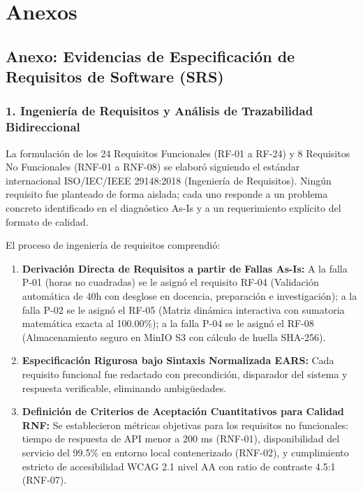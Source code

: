 \documentclass[12pt,a4paper]{article}
\begin{document}
\vspace{0.4cm}

\section{Anexos}

\subsection*{Anexo: Evidencias de Especificación de Requisitos de Software (SRS)}

\subsubsection*{1. Ingeniería de Requisitos y Análisis de Trazabilidad Bidireccional}
La formulación de los 24 Requisitos Funcionales (RF-01 a RF-24) y 8 Requisitos No Funcionales (RNF-01 a RNF-08) se elaboró siguiendo el estándar internacional ISO/IEC/IEEE 29148:2018 (Ingeniería de Requisitos). Ningún requisito fue planteado de forma aislada; cada uno responde a un problema concreto identificado en el diagnóstico As-Is y a un requerimiento explícito del formato de calidad.

El proceso de ingeniería de requisitos comprendió:
\begin{enumerate}[leftmargin=1.5em, itemsep=2pt]
    \item \textbf{Derivación Directa de Requisitos a partir de Fallas As-Is:} A la falla P-01 (horas no cuadradas) se le asignó el requisito RF-04 (Validación automática de 40h con desglose en docencia, preparación e investigación); a la falla P-02 se le asignó el RF-05 (Matriz dinámica interactiva con sumatoria matemática exacta al 100.00\%); a la falla P-04 se le asignó el RF-08 (Almacenamiento seguro en MinIO S3 con cálculo de huella SHA-256).
    \item \textbf{Especificación Rigurosa bajo Sintaxis Normalizada EARS:} Cada requisito funcional fue redactado con precondición, disparador del sistema y respuesta verificable, eliminando ambigüedades.
    \item \textbf{Definición de Criterios de Aceptación Cuantitativos para Calidad RNF:} Se establecieron métricas objetivas para los requisitos no funcionales: tiempo de respuesta de API menor a 200 ms (RNF-01), disponibilidad del servicio del 99.5\% en entorno local contenerizado (RNF-02), y cumplimiento estricto de accesibilidad WCAG 2.1 nivel AA con ratio de contraste 4.5:1 (RNF-07).
\end{enumerate}
\end{document}
